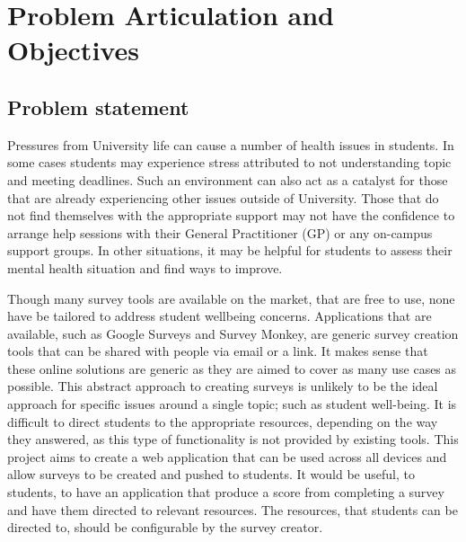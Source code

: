 \section{Problem Articulation and Objectives}

\subsection{Problem statement} \label{problemstatement}

Pressures from University life can cause a number of health issues in students.
In some cases students may experience stress attributed to not understanding topic and meeting deadlines.
Such an environment can also act as a catalyst for those that are already experiencing other issues outside of University.
Those that do not find themselves with the appropriate support may not have the confidence to arrange help sessions with their
General Practitioner (GP) or any on-campus support groups. 
In other situations, it may be helpful for students to assess their mental health situation and find ways to improve.

Though many survey tools are available on the market, that are free to use, none have be tailored to address student wellbeing concerns.
Applications that are available, such as Google Surveys and Survey Monkey, are generic survey creation tools that can be shared with 
people via email or a link.
It makes sense that these online solutions are generic as they are aimed to cover as many use cases as possible.
This abstract approach to creating surveys is unlikely to be the ideal approach for specific issues around a single topic; such as
student well-being.
It is difficult to direct students to the appropriate resources, depending on the way they answered, as this type of functionality is not
provided by existing tools.
This project aims to create a web application that can be used across all devices and allow surveys to be created and pushed to students.
It would be useful, to students, to have an application that produce a score from completing a survey and have them directed to relevant
resources. 
The resources, that students can be directed to, should be configurable by the survey creator.

